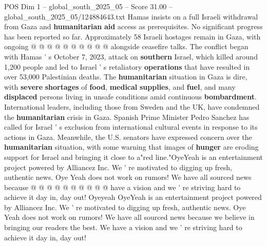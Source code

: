 \begin{textsample}{POS Dim 1 – global\_south\_2025\_05 – Score 31.00 – global\_south\_2025\_05/124884643.txt}
Hamas insists on a full Israeli withdrawal from Gaza and \textbf{humanitarian} \textbf{aid} access as prerequisites.
No significant progress has been reported so far.
Approximately 58 Israeli hostages remain in Gaza, with ongoing @ @ @ @ @ @ @ @ @ @ alongside ceasefire talks.
The conflict began with Hamas ' s October 7, 2023, attack on \textbf{southern} Israel, which killed around 1,200 people and led to Israel ' s retaliatory \textbf{operations} that have resulted in over 53,000 Palestinian deaths.
The \textbf{humanitarian} situation in Gaza is dire, with \textbf{severe} \textbf{shortages} of \textbf{food}, \textbf{medical} \textbf{supplies}, and \textbf{fuel}, and many \textbf{displaced} persons living in unsafe conditions amid continuous \textbf{bombardment}.
International leaders, including those from Sweden and the UK, have condemned the \textbf{humanitarian} crisis in Gaza.
Spanish Prime Minister Pedro Sanchez has called for Israel ' s exclusion from international cultural events in response to its actions in Gaza.
Meanwhile, the U.S. senators have expressed concern over the \textbf{humanitarian} situation, with some warning that images of \textbf{hunger} are eroding support for Israel and bringing it close to a"red line."OyeYeah is an entertainment project powered by Alliancez Inc.
We ' re motivated to digging up fresh, authentic news.
Oye Yeah does not work on rumors!
We have all sourced news because @ @ @ @ @ @ @ @ @ @ have a vision and we ' re striving hard to achieve it day in, day out!
Oyeyeah OyeYeah is an entertainment project powered by Alliancez Inc.
We ' re motivated to digging up fresh, authentic news.
Oye Yeah does not work on rumors!
We have all sourced news because we believe in bringing our readers the best.
We have a vision and we ' re striving hard to achieve it day in, day out!

\end{textsample}
